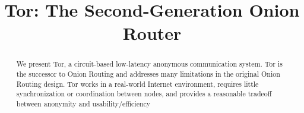 \documentclass[times,10pt,twocolumn]{article}
\begin{document}

\title{Tor: The Second-Generation Onion Router}


\maketitle
\thispagestyle{empty}

\begin{abstract}
We present Tor, a circuit-based low-latency anonymous communication
system. Tor is the successor to Onion Routing
and addresses many limitations in the original Onion Routing design.
Tor works in a real-world Internet environment,
requires little synchronization or coordination between nodes, and
provides a reasonable tradeoff between anonymity and usability/efficiency
\end{abstract}



\label{sec:intro}
\end{document}
